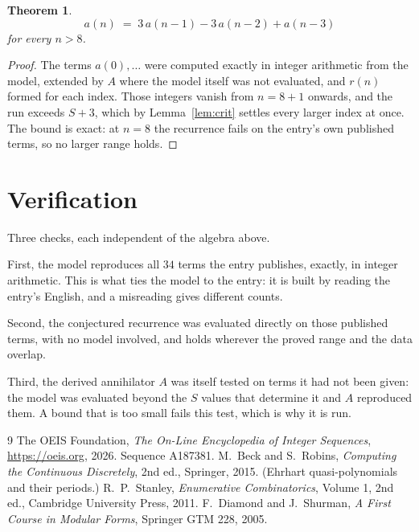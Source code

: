 \documentclass[11pt,a4paper]{article}
\theoremstyle{plain}
\newtheorem{theorem}{Theorem}
\theoremstyle{definition}
\begin{document}
\begin{theorem}
\[
a(n)\;=\;3\,a(n-1) - 3\,a(n-2) + a(n-3)
\]
for every $n>8$.
\end{theorem}

\begin{proof}
The terms $a(0),\dots$ were computed exactly in integer arithmetic from the model, extended by
$A$ where the model itself was not evaluated, and $r(n)$ formed for each index. Those integers
vanish from $n=8+1$ onwards, and the run exceeds $S+3$, which by
Lemma~\ref{lem:crit} settles every larger index at once. The bound is exact: at $n=8$ the recurrence fails on the entry's own published terms, so no larger range holds.
\end{proof}

\section{Verification}

Three checks, each independent of the algebra above.

First, the model reproduces all $34$ terms the entry publishes, exactly, in integer
arithmetic. This is what ties the model to the entry: it is built by reading the entry's
English, and a misreading gives different counts.

Second, the conjectured recurrence was evaluated directly on those published terms, with no
model involved, and holds wherever the proved range and the data overlap.

Third, the derived annihilator $A$ was itself tested on terms it had not been given: the model
was evaluated beyond the $S$ values that determine it and $A$ reproduced them. A bound that is
too small fails this test, which is why it is run.

\begin{thebibliography}{9}
 The OEIS Foundation, \emph{The On-Line Encyclopedia of Integer
Sequences}, \url{https://oeis.org}, 2026. Sequence A187381.
 M.~Beck and S.~Robins, \emph{Computing the Continuous Discretely},
2nd ed., Springer, 2015. (Ehrhart quasi-polynomials and their periods.)
 R.~P.~Stanley, \emph{Enumerative Combinatorics}, Volume 1, 2nd ed.,
Cambridge University Press, 2011.
 F.~Diamond and J.~Shurman, \emph{A First Course in Modular Forms},
Springer GTM 228, 2005.
\end{thebibliography}
\end{document}
